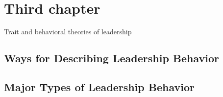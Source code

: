 

\section{Third chapter}
Trait and behavioral theories of leadership

\subsection{Ways for Describing Leadership Behavior} %
\label{sub:ways_for_describing_leadership_behavior}

\subsection{Major Types of Leadership Behavior} %
\label{ssub:major_types_of_leadership_behavior}

